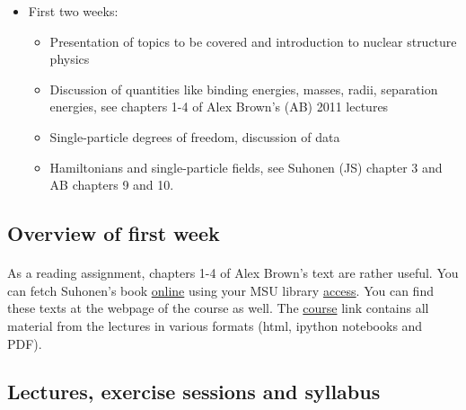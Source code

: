\documentclass[%
oneside,                 %
final,                   %
10pt]{article}
\begin{document}
\begin{itemize}
\item First two weeks:
\begin{itemize}

 \item Presentation of topics to be covered and introduction to nuclear structure physics

 \item Discussion of quantities like binding energies, masses, radii, separation energies, see chapters 1-4 of Alex Brown's (AB) 2011 lectures

 \item Single-particle degrees of freedom, discussion of data

 \item Hamiltonians and single-particle fields, see  Suhonen (JS) chapter 3  and AB chapters 9 and 10.
\end{itemize}

\noindent
\end{itemize}

\noindent




\subsection*{Overview of first week}

\paragraph{}
As a reading assignment, chapters 1-4 of Alex Brown's text are rather useful.
You can fetch Suhonen's book \href{{http://link.springer.com.proxy2.cl.msu.edu/book/10.1007/978-3-540-48861-3/page/1}}{online} using your MSU library \href{{https://www.lib.msu.edu/general/account/}}{access}.
You can find these texts at the webpage of the course as well.
The \href{{http://nuclearstructure.github.io/PHY981/doc/web/course.html}}{course} link contains 
all material from the lectures in various formats (html, ipython notebooks and PDF).






\subsection*{Lectures, exercise sessions and syllabus}
\end{document}
